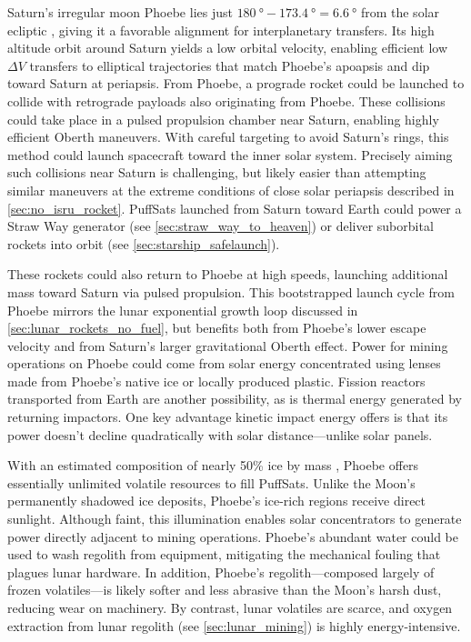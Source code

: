 \documentclass{article}
\begin{document}
Saturn’s irregular moon Phoebe lies just $\SI{180}{\degree} - \SI{173.4}{\degree} = \SI{6.6}{\degree}$ from the solar ecliptic \cite{phoebe}, giving it a favorable alignment for interplanetary transfers. Its high altitude orbit around Saturn yields a low orbital velocity, enabling efficient low $\Delta V$ transfers to elliptical trajectories that match Phoebe’s apoapsis and dip toward Saturn at periapsis.  From Phoebe, a prograde rocket could be launched to collide with retrograde payloads also originating from Phoebe. These collisions could take place in a pulsed propulsion chamber near Saturn, enabling highly efficient Oberth maneuvers. With careful targeting to avoid Saturn’s rings, this method could launch spacecraft toward the inner solar system. Precisely aiming such collisions near Saturn is challenging, but likely easier than attempting similar maneuvers at the extreme conditions of close solar periapsis described in \autoref{sec:no_isru_rocket}. PuffSats launched from Saturn toward Earth could power a Straw Way generator (see \autoref{sec:straw_way_to_heaven}) or deliver suborbital rockets into orbit (see \autoref{sec:starship_safelaunch}).

These rockets could also return to Phoebe at high speeds, launching additional mass toward Saturn via pulsed propulsion. This bootstrapped launch cycle from Phoebe mirrors the lunar exponential growth loop discussed in \autoref{sec:lunar_rockets_no_fuel}, but benefits both from Phoebe’s lower escape velocity and from Saturn's larger gravitational Oberth effect. Power for mining operations on Phoebe could come from solar energy concentrated using lenses made from Phoebe's native ice or locally produced plastic. Fission reactors transported from Earth are another possibility, as is thermal energy generated by returning impactors.  One key advantage kinetic impact energy offers is that its power doesn't decline quadratically with solar distance—unlike solar panels.

With an estimated composition of nearly 50\% ice by mass \cite{phoebe}, Phoebe offers essentially unlimited volatile resources to fill PuffSats. Unlike the Moon’s permanently shadowed ice deposits, Phoebe’s ice-rich regions receive direct sunlight. Although faint, this illumination enables solar concentrators to generate power directly adjacent to mining operations. Phoebe’s abundant water could be used to wash regolith from equipment, mitigating the mechanical fouling that plagues lunar hardware. In addition, Phoebe’s regolith—composed largely of frozen volatiles—is likely softer and less abrasive than the Moon’s harsh dust, reducing wear on machinery. By contrast, lunar volatiles are scarce, and oxygen extraction from lunar regolith (see \autoref{sec:lunar_mining}) is highly energy-intensive.
\end{document}
